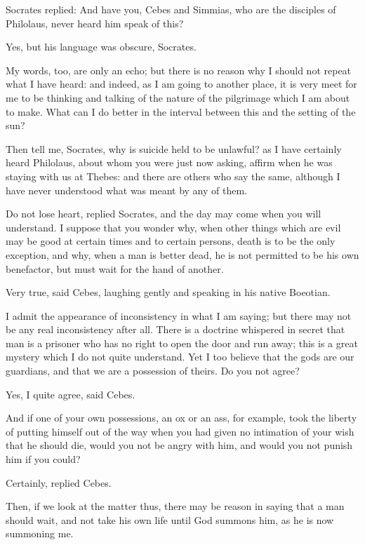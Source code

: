 Socrates replied: And have you, Cebes and Simmias, who are the disciples
of Philolaus, never heard him speak of this?

Yes, but his language was obscure, Socrates.

My words, too, are only an echo; but there is no reason why I should not
repeat what I have heard: and indeed, as I am going to another place, it
is very meet for me to be thinking and talking of the nature of the
pilgrimage which I am about to make. What can I do better in the interval
between this and the setting of the sun?

Then tell me, Socrates, why is suicide held to be unlawful? as I have
certainly heard Philolaus, about whom you were just now asking, affirm
when he was staying with us at Thebes: and there are others who say the
same, although I have never understood what was meant by any of them.

Do not lose heart, replied Socrates, and the day may come when you will
understand. I suppose that you wonder why, when other things which are
evil may be good at certain times and to certain persons, death is to be
the only exception, and why, when a man is better dead, he is not
permitted to be his own benefactor, but must wait for the hand of another.

Very true, said Cebes, laughing gently and speaking in his native
Boeotian.

I admit the appearance of inconsistency in what I am saying; but there may
not be any real inconsistency after all. There is a doctrine whispered in
secret that man is a prisoner who has no right to open the door and run
away; this is a great mystery which I do not quite understand. Yet I too
believe that the gods are our guardians, and that we are a possession of
theirs. Do you not agree?

Yes, I quite agree, said Cebes.

And if one of your own possessions, an ox or an ass, for example, took the
liberty of putting himself out of the way when you had given no intimation
of your wish that he should die, would you not be angry with him, and
would you not punish him if you could?

Certainly, replied Cebes.

Then, if we look at the matter thus, there may be reason in saying that a
man should wait, and not take his own life until God summons him, as he is
now summoning me.

